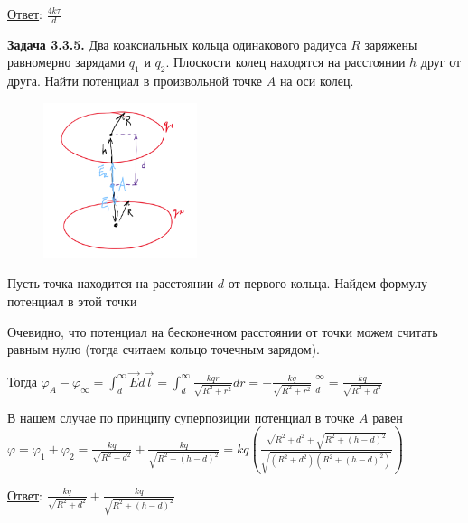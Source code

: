 \bigvspace

\underline{Ответ}: $\frac{4k\tau}{d}$


\clearpage

\begin{tcolorbox}
    \textbf{Задача 3.3.5.} Два коаксиальных кольца одинакового радиуса $R$
    заряжены равномерно зарядами $q_1$ и $q_2$. Плоскости колец находятся
    на расстоянии $h$ друг от друга. Найти потенциал в произвольной
    точке $A$ на оси колец.
\end{tcolorbox}

\begin{minipage}{\textwidth}
    \begin{figure}
        \includegraphics[width=0.4\textwidth]{physics1/images/physics1_homework_7_2}
    \end{figure}

    Пусть точка находится на расстоянии $d$ от первого кольца. Найдем формулу потенциал в этой точки

    Очевидно, что потенциал на бесконечном расстоянии от точки можем считать равным нулю (тогда считаем кольцо точечным зарядом). 

    Тогда $\varphi_A - \varphi_\infty = \int_{d}^{\infty} \vec{E}d\vec{l} = \int_{d}^{\infty} \frac{kqr}{\sqrt{R^2 + r^2}} dr = 
    -\frac{kq}{\sqrt{R^2 + r^2}} \Big|_{d}^{\infty} = \frac{kq}{\sqrt{R^2 + d^2}}$

    В нашем случае по принципу суперпозиции потенциал в точке $A$ равен $\varphi = \varphi_1 + \varphi_2 = 
    \frac{kq}{\sqrt{R^2 + d^2}} + \frac{kq}{\sqrt{R^2 + (h - d)^2}} = 
    kq\left(\frac{\sqrt{R^2 + d^2} + \sqrt{R^2 + (h - d)^2}}{\sqrt{(R^2 + d^2)(R^2 + (h - d)^2)}}\right)$
\end{minipage}

\bigvspace

\underline{Ответ}: $\frac{kq}{\sqrt{R^2 + d^2}} + \frac{kq}{\sqrt{R^2 + (h - d)^2}}$

\clearpage

